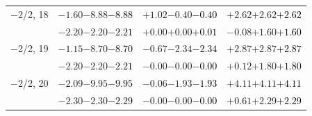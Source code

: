 \documentclass[compress]{beamer}
\begin{document}
\begin{frame}
\begin{tabular}{r | c | c | c}
$-$2/2, 18 & $-1.60$\hspace{0.1 cm}$-8.88$\hspace{0.1 cm}\textcolor{black}{$-8.88$} & $+1.02$\hspace{0.1 cm}$-0.40$\hspace{0.1 cm}\textcolor{black}{$-0.40$} & $+2.62$\hspace{0.1 cm}$+2.62$\hspace{0.1 cm}\textcolor{black}{$+2.62$} \\
           & $-2.20$\hspace{0.1 cm}$-2.20$\hspace{0.1 cm}\textcolor{black}{$-2.21$} & $+0.00$\hspace{0.1 cm}$+0.00$\hspace{0.1 cm}\textcolor{black}{$+0.01$} & $-0.08$\hspace{0.1 cm}$+1.60$\hspace{0.1 cm}\textcolor{black}{$+1.60$} \\
$-$2/2, 19 & $-1.15$\hspace{0.1 cm}$-8.70$\hspace{0.1 cm}\textcolor{black}{$-8.70$} & $-0.67$\hspace{0.1 cm}$-2.34$\hspace{0.1 cm}\textcolor{black}{$-2.34$} & $+2.87$\hspace{0.1 cm}$+2.87$\hspace{0.1 cm}\textcolor{black}{$+2.87$} \\
           & $-2.20$\hspace{0.1 cm}$-2.20$\hspace{0.1 cm}\textcolor{black}{$-2.21$} & $-0.00$\hspace{0.1 cm}$-0.00$\hspace{0.1 cm}\textcolor{black}{$-0.00$} & $+0.12$\hspace{0.1 cm}$+1.80$\hspace{0.1 cm}\textcolor{black}{$+1.80$} \\
$-$2/2, 20 & $-2.09$\hspace{0.1 cm}$-9.95$\hspace{0.1 cm}\textcolor{black}{$-9.95$} & $-0.06$\hspace{0.1 cm}$-1.93$\hspace{0.1 cm}\textcolor{black}{$-1.93$} & $+4.11$\hspace{0.1 cm}$+4.11$\hspace{0.1 cm}\textcolor{black}{$+4.11$} \\
           & $-2.30$\hspace{0.1 cm}$-2.30$\hspace{0.1 cm}\textcolor{black}{$-2.29$} & $-0.00$\hspace{0.1 cm}$-0.00$\hspace{0.1 cm}\textcolor{black}{$-0.00$} & $+0.61$\hspace{0.1 cm}$+2.29$\hspace{0.1 cm}\textcolor{black}{$+2.29$} \\

\end{tabular}
\end{frame}
\end{document}
